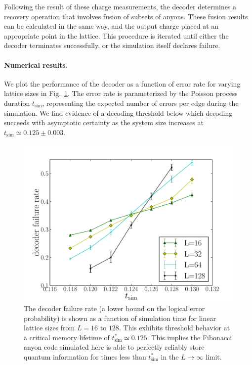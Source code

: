 \documentclass[aps, prl, letterpaper, twocolumn, superscriptaddress, notitlepage, 10pt]{revtex4-1}
\newcommand{\Fref}[1]{Fig.~\ref{#1}}
\begin{document}
Following the result of these charge measurements, the decoder determines 
a recovery operation that involves fusion of subsets of anyons. 
These fusion results can be calculated in the same way, 
and the output charge placed at an appropriate point in the lattice. 
This procedure is iterated until either the decoder terminates successfully, 
or the simulation itself declares failure.


\paragraph{Numerical results.}

We plot the performance of the decoder as a function of error rate for varying lattice sizes in 
\Fref{f:threshold}. 
The error rate is parameterized by the Poisson process duration $t_{\mathrm{sim}}$, representing the expected number of errors per edge during the simulation. 
We find evidence of a decoding threshold below which decoding succeeds with asymptotic 
certainty as the system size increases at $t_{\mathrm{sim}}\simeq 0.125 \pm 0.003$.

\begin{figure}[t!]
\begin{center}
	\includegraphics[width=\columnwidth]{anyons-kyle.pdf}
\caption{The decoder failure rate (a lower bound on the logical error probability) is shown as a function of simulation time for linear lattice sizes from $L=16$ to $128$. 
This exhibits threshold behavior at a critical memory lifetime of $t_{\mathrm{sim}}^*\simeq 0.125$. 
This implies the Fibonacci anyon code simulated here is able to perfectly reliably store quantum information for times less than $t_{\mathrm{sim}}^*$ in the $L\to \infty$ limit.}
\label{f:threshold}
\end{center}
\vspace{-10pt}
\end{figure}
\end{document}
